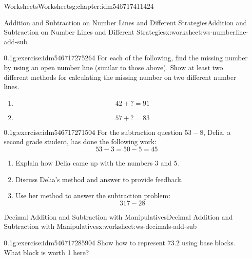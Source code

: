 \documentclass[twoside,11pt,]{book}
\begin{document}
\begin{chapterptx}{Worksheets}{}{Worksheets}{}{}{g:chapter:idm546717411424}
\begin{worksheet-section-numberless}{Addition and Subtraction on Number Lines and Different Strategies}{}{Addition and Subtraction on Number Lines and Different Strategies}{}{}{x:worksheet:ws-numberline-add-sub}
\begin{divisionexercise}{2}{}{0.1}{g:exercise:idm546717275264}%
For each of the following, find the missing number by using an open number line (similar to those above).  Show at least two different methods for calculating the missing number on two different number lines.%
%
\begin{enumerate}[label=(\alph*)]
\item{}%
\begin{equation*}
42+?=91 
\end{equation*}
%
\item{}%
\begin{equation*}
57+?=83 
\end{equation*}
%
\end{enumerate}
\end{divisionexercise}%
\begin{divisionexercise}{3}{}{0.1}{g:exercise:idm546717271504}%
For the subtraction question \(53-8\), Delia, a second grade student, has done the following work:%
\begin{equation*}
53- 3=50-5=45
\end{equation*}
%
%
\begin{enumerate}[label=(\alph*)]
\item{}Explain how Delia came up with the numbers 3 and 5.%
\item{}Discuss Delia's method and answer to provide feedback.%
\item{}Use her method to answer the subtraction problem:%
\begin{equation*}
317-28
\end{equation*}
%
\end{enumerate}
\end{divisionexercise}%
\end{worksheet-section-numberless}
\restoregeometry
%
%
\typeout{************************************************}
\typeout{************************************************}
%
\begin{worksheet-section-numberless}{Decimal Addition and Subtraction with Manipulatives}{}{Decimal Addition and Subtraction with Manipulatives}{}{}{x:worksheet:ws-decimals-add-sub}
\begin{divisionexercise}{1}{}{0.1}{g:exercise:idm546717285904}%
Show how to represent 73.2 using base blocks.  What block is worth 1 here?%
\end{divisionexercise}%

\end{worksheet-section-numberless}
\end{chapterptx}
\end{document}
